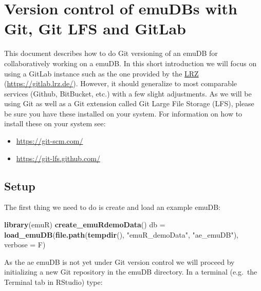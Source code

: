 \documentclass[]{book}
\newenvironment{Shaded}{\begin{snugshade}}{\end{snugshade}}
\newcommand{\DataTypeTok}[1]{\textcolor[rgb]{0.13,0.29,0.53}{#1}}
\newcommand{\KeywordTok}[1]{\textcolor[rgb]{0.13,0.29,0.53}{\textbf{#1}}}
\newcommand{\NormalTok}[1]{#1}
\newcommand{\StringTok}[1]{\textcolor[rgb]{0.31,0.60,0.02}{#1}}
\providecommand{\tightlist}{%
  \setlength{\itemsep}{0pt}\setlength{\parskip}{0pt}}
\begin{document}
\hypertarget{version-control-of-emudbs-with-git-git-lfs-and-gitlab}{%
\chapter{Version control of emuDBs with Git, Git LFS and GitLab}\label{version-control-of-emudbs-with-git-git-lfs-and-gitlab}}

This document describes how to do Git versioning of an emuDB for collaboratively working on a emuDB. In this short introduction we will focus on using a GitLab instance such as the one provided by the \href{https://www.lrz.de/}{LRZ} (\url{https://gitlab.lrz.de/}). However, it should generalize to most comparable services (Github, BitBucket, etc.) with a few slight adjustments. As we will be using Git as well as a Git extension called Git Large File Storage (LFS), please be sure you have these installed on your system. For information on how to install these on your system see:

\begin{itemize}
\tightlist
\item
  \url{https://git-scm.com/}
\item
  \url{https://git-lfs.github.com/}
\end{itemize}

\hypertarget{setup}{%
\section{Setup}\label{setup}}

The first thing we need to do is create and load an example emuDB:

\begin{Shaded}
\begin{Highlighting}[]
\KeywordTok{library}\NormalTok{(emuR)}
\KeywordTok{create_emuRdemoData}\NormalTok{()}
\NormalTok{db =}\StringTok{ }\KeywordTok{load_emuDB}\NormalTok{(}\KeywordTok{file.path}\NormalTok{(}\KeywordTok{tempdir}\NormalTok{(),}
                          \StringTok{"emuR_demoData"}\NormalTok{,}
                          \StringTok{"ae_emuDB"}\NormalTok{),}
                \DataTypeTok{verbose =}\NormalTok{ F)}
\end{Highlighting}
\end{Shaded}

As the ae emuDB is not yet under Git version control we will proceed by initializing a new Git repository in the emuDB directory. In a terminal (e.g.~the Terminal tab in RStudio) type:
\end{document}
